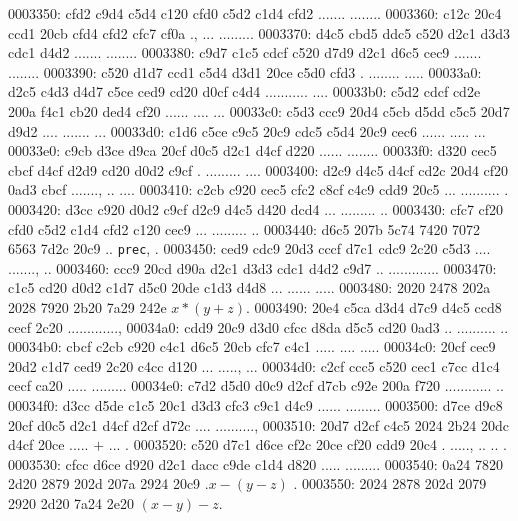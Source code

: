 \begin{bo
00010e0: 7865 647d 5c62 6567 696e 7b76 6572 6261  xed}
\begin{verba
00010f0: 7469 6d7d 0a20 2023 7479 7065 2074 6572  tim}
\begin{
0001c40: 7665 7262 6174 696d 7d0a 2020 236c 6574  verbatim}
\begin{boxe
00027a0: 647d 5c62 6567 696e 7b76 6572 6261 7469  d}
\begin{verbati
00027b0: 6d7d 0a20 2023 6c65 7420 696e 6669 7865  m}
\begin{v
0002c60: 6572 6261 7469 6d7d 0a20 2023 6c65 7420  erbatim}
\begin{
0002dc0: 7665 7262 6174 696d 7d0a 2020 236c 6574  verbatim}
\begin{boxed
0002f30: 7d5c 6265 6769 6e7b 7665 7262 6174 696d  }
\begin{verbatim
0002f40: 7d0a 2020 236c 6574 2068 6428 683a 3a74  }
0003350: cfd2 c9d4 c5d4 c120 cfd0 c5d2 c1d4 cfd2  ....... ........
0003360: c12c 20c4 ccd1 20cb cfd4 cfd2 cfc7 cf0a  ., ... .........
0003370: d4c5 cbd5 ddc5 c520 d2c1 d3d3 cdc1 d4d2  ....... ........
0003380: c9d7 c1c5 cdcf c520 d7d9 d2c1 d6c5 cec9  ....... ........
0003390: c520 d1d7 ccd1 c5d4 d3d1 20ce c5d0 cfd3  . ........ .....
00033a0: d2c5 c4d3 d4d7 c5ce ced9 cd20 d0cf c4d4  ........... ....
00033b0: c5d2 cdcf cd2e 200a f4c1 cb20 ded4 cf20  ...... .... ... 
00033c0: c5d3 ccc9 20d4 c5cb d5dd c5c5 20d7 d9d2  .... ....... ...
00033d0: c1d6 c5ce c9c5 20c9 cdc5 c5d4 20c9 cec6  ...... ..... ...
00033e0: c9cb d3ce d9ca 20cf d0c5 d2c1 d4cf d220  ...... ........ 
00033f0: d320 cec5 cbcf d4cf d2d9 cd20 d0d2 c9cf  . ......... ....
0003400: d2c9 d4c5 d4cf cd2c 20d4 cf20 0ad3 cbcf  ......., .. ....
0003410: c2cb c920 cec5 cfc2 c8cf c4c9 cdd9 20c5  ... .......... .
0003420: d3cc c920 d0d2 c9cf d2c9 d4c5 d420 dcd4  ... ......... ..
0003430: cfc7 cf20 cfd0 c5d2 c1d4 cfd2 c120 cec9  ... ......... ..
0003440: d6c5 207b 5c74 7420 7072 6563 7d2c 20c9  .. {\tt prec}, .
0003450: ced9 cdc9 20d3 cccf d7c1 cdc9 2c20 c5d3  .... ......., ..
0003460: ccc9 20cd d90a d2c1 d3d3 cdc1 d4d2 c9d7  .. .............
0003470: c1c5 cd20 d0d2 c1d7 d5c0 20de c1d3 d4d8  ... ...... .....
0003480: 2020 2478 202a 2028 7920 2b20 7a29 242e    $x * (y + z)$.
0003490: 20e4 c5ca d3d4 d7c9 d4c5 ccd8 cecf 2c20   ............., 
00034a0: cdd9 20c9 d3d0 cfcc d8da d5c5 cd20 0ad3  .. .......... ..
00034b0: cbcf c2cb c920 c4c1 d6c5 20cb cfc7 c4c1  ..... .... .....
00034c0: 20cf cec9 20d2 c1d7 ced9 2c20 c4cc d120   ... ....., ... 
00034d0: c2cf ccc5 c520 cec1 c7cc d1c4 cecf ca20  ..... ......... 
00034e0: c7d2 d5d0 d0c9 d2cf d7cb c92e 200a f720  ............ .. 
00034f0: d3cc d5de c1c5 20c1 d3d3 cfc3 c9c1 d4c9  ...... .........
0003500: d7ce d9c8 20cf d0c5 d2c1 d4cf d2cf d72c  .... ..........,
0003510: 20d7 d2cf c4c5 2024 2b24 20dc d4cf 20ce   ..... $+$ ... .
0003520: c520 d7c1 d6ce cf2c 20ce cf20 cdd9 20c4  . ....., .. .. .
0003530: cfcc d6ce d920 d2c1 dacc c9de c1d4 d820  ..... ......... 
0003540: 0a24 7820 2d20 2879 202d 207a 2924 20c9  .$x - (y - z)$ .
0003550: 2024 2878 202d 2079 2920 2d20 7a24 2e20   $(x - y) - z$. 

\end{verbatim
0002f40: 7d0a 2020 236c 6574 2068 6428 683a 3a74  }
\end{boxed
0002f30: 7d5c 6265 6769 6e7b 7665 7262 6174 696d  }
\end{
0002dc0: 7665 7262 6174 696d 7d0a 2020 236c 6574  verbatim}
\end{v
0002c60: 6572 6261 7469 6d7d 0a20 2023 6c65 7420  erbatim}
\end{verbati
00027b0: 6d7d 0a20 2023 6c65 7420 696e 6669 7865  m}
\end{boxe
00027a0: 647d 5c62 6567 696e 7b76 6572 6261 7469  d}
\end{
0001c40: 7665 7262 6174 696d 7d0a 2020 236c 6574  verbatim}
\end{verba
00010f0: 7469 6d7d 0a20 2023 7479 7065 2074 6572  tim}
\end{bo
00010e0: 7865 647d 5c62 6567 696e 7b76 6572 6261  xed}
